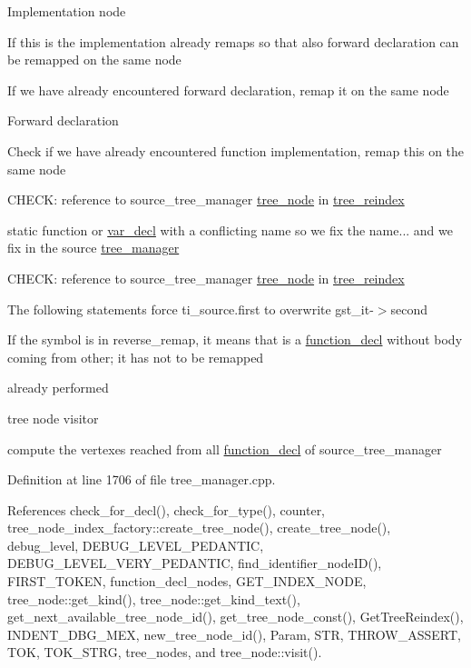 Implementation node

If this is the implementation already remaps so that also forward declaration can be remapped on the same node

If we have already encountered forward declaration, remap it on the same node

Forward declaration

Check if we have already encountered function implementation, remap this on the same node

C\+H\+E\+CK\+: reference to source\+\_\+tree\+\_\+manager \hyperlink{classtree__node}{tree\+\_\+node} in \hyperlink{classtree__reindex}{tree\+\_\+reindex}

static function or \hyperlink{structvar__decl}{var\+\_\+decl} with a conflicting name so we fix the name... and we fix in the source \hyperlink{classtree__manager}{tree\+\_\+manager}

C\+H\+E\+CK\+: reference to source\+\_\+tree\+\_\+manager \hyperlink{classtree__node}{tree\+\_\+node} in \hyperlink{classtree__reindex}{tree\+\_\+reindex}

The following statements force ti\+\_\+source.\+first to overwrite gst\+\_\+it-\/$>$second

If the symbol is in reverse\+\_\+remap, it means that is a \hyperlink{structfunction__decl}{function\+\_\+decl} without body coming from other; it has not to be remapped

already performed

tree node visitor

compute the vertexes reached from all \hyperlink{structfunction__decl}{function\+\_\+decl} of source\+\_\+tree\+\_\+manager 

Definition at line 1706 of file tree\+\_\+manager.\+cpp.



References check\+\_\+for\+\_\+decl(), check\+\_\+for\+\_\+type(), counter, tree\+\_\+node\+\_\+index\+\_\+factory\+::create\+\_\+tree\+\_\+node(), create\+\_\+tree\+\_\+node(), debug\+\_\+level, D\+E\+B\+U\+G\+\_\+\+L\+E\+V\+E\+L\+\_\+\+P\+E\+D\+A\+N\+T\+IC, D\+E\+B\+U\+G\+\_\+\+L\+E\+V\+E\+L\+\_\+\+V\+E\+R\+Y\+\_\+\+P\+E\+D\+A\+N\+T\+IC, find\+\_\+identifier\+\_\+node\+I\+D(), F\+I\+R\+S\+T\+\_\+\+T\+O\+K\+EN, function\+\_\+decl\+\_\+nodes, G\+E\+T\+\_\+\+I\+N\+D\+E\+X\+\_\+\+N\+O\+DE, tree\+\_\+node\+::get\+\_\+kind(), tree\+\_\+node\+::get\+\_\+kind\+\_\+text(), get\+\_\+next\+\_\+available\+\_\+tree\+\_\+node\+\_\+id(), get\+\_\+tree\+\_\+node\+\_\+const(), Get\+Tree\+Reindex(), I\+N\+D\+E\+N\+T\+\_\+\+D\+B\+G\+\_\+\+M\+EX, new\+\_\+tree\+\_\+node\+\_\+id(), Param, S\+TR, T\+H\+R\+O\+W\+\_\+\+A\+S\+S\+E\+RT, T\+OK, T\+O\+K\+\_\+\+S\+T\+RG, tree\+\_\+nodes, and tree\+\_\+node\+::visit().



